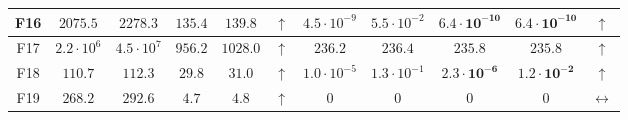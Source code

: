 \begin{table*}[!t]
\begin{scriptsize}
\begin{tabular}{c || c c | c c c || c c | c c c}
F16 & $2075.5$             & $2278.3$           & $\mathbf{135.4}$              & $\mathbf{139.8}$              & $\uparrow$        & $4.5 \cdot 10^{-9}$  & $5.5 \cdot 10^{-2}$  & $\mathbf{6.4 \cdot 10^{-10}}$ & $\mathbf{6.4 \cdot 10^{-10}}$ & $\uparrow$         \\ \hline
F17 & $2.2 \cdot 10^{6}$   & $4.5 \cdot 10^{7}$ & $\mathbf{956.2}$              & $\mathbf{1028.0}$             & $\uparrow$        & $236.2$              & $236.4$             & $\mathbf{235.8}$              & $\mathbf{235.8}$              & $\uparrow$         \\ \hline
F18 & $110.7$              & $112.3$            & $\mathbf{29.8}$               & $\mathbf{31.0}$               & $\uparrow$        & $1.0 \cdot 10^{-5}$  & $1.3 \cdot 10^{-1}$  & $\mathbf{2.3 \cdot 10^{-6}}$  & $\mathbf{1.2 \cdot 10^{-2}}$  & $\uparrow$         \\ \hline
F19 & $268.2$              & $292.6$            & $\mathbf{4.7}$                & $\mathbf{4.8}$                & $\uparrow$        & $0$                  & $0$                  & $0$                  & $0$                  & $\leftrightarrow$ \\ \hline
\end{tabular}
\end{scriptsize}
\end{table*}

